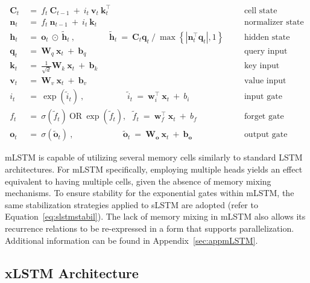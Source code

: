 \begin{align}
\label{eq:mlstm_recurrent_begin}
\mathbf{C}_t \ &= \  f_t \ \mathbf{C}_{t-1} \ + \ 
  i_t \ \mathbf{v}_t \ \mathbf{k}_t^\top & &  &\text{cell state} \\
\mathbf{n}_t \ &= \  f_t \ \mathbf{n}_{t-1} \ + \ 
  i_t \ \mathbf{k}_t & &  &\text{normalizer state} \\
\mathbf{h}_t  \ &= \ \mathbf{o}_t \ \odot \ \tilde{\mathbf{h}}_t
\ , \qquad \qquad 
\tilde{\mathbf{h}}_t \ = \   \mathbf{C}_t \mathbf{q}_t \ / \ 
  \max \left\{ |\mathbf{n}_t^\top \mathbf{q}_t|, 1 \right\} 
   &&&\text{hidden state} \\
\mathbf{q}_t \ &= \ \mathbf{W}_q \ \mathbf{x}_t \ + \ \mathbf{b}_q  & &  &\text{query input} \\
\mathbf{k}_t \ &= \ \frac{1}{\sqrt{d}} \mathbf{W}_k \ \mathbf{x}_t \ + \ \mathbf{b}_k  & &  &\text{key input} \\
\mathbf{v}_t \ &= \ \mathbf{W}_v \ \mathbf{x}_t \ + \ \mathbf{b}_v  & &  &\text{value input} \\
i_t \ &= \ \!\exp \!  \! \left( \tilde{i}_t  \right) \ , 
 \qquad \qquad \ \ \ \ \,
  \tilde{i}_t \ = \ \mathbf{w}^\top_{i} \ \mathbf{x}_t \ + \  b_{i} \ \ \ 
  &&&\text{input gate} \\
f_t \ &= \ \sigma \!  \left(  \tilde{f}_t \right) \ \text{OR} \ \!\exp \!  \! \left(  \tilde{f}_t \right) , \ \ \: \!
\tilde{f}_t \ = \ \mathbf{w}^\top_{f} \ \mathbf{x}_t  \ + \
  b_{f}
  &&& \text{forget gate} \\
\label{eq:mlstm_recurrent_end}
\mathbf{o}_t \ &= \ \sigma \left( \tilde{\mathbf{o}}_t \right) \ , \qquad \qquad \quad \ \ \ \,
  \tilde{\mathbf{o}}_t  \ = \ \mathbf{W}_{\mathbf{o}} \ \mathbf{x}_t \ + \
  \mathbf{b}_{\mathbf{o}}
  &&&\text{output gate} 
\end{align}

mLSTM is capable of utilizing several memory cells similarly to standard LSTM architectures. For mLSTM specifically, employing multiple heads yields an effect equivalent to having multiple cells, given the absence of memory mixing mechanisms. To ensure stability for the exponential gates within mLSTM, the same stabilization strategies applied to sLSTM are adopted (refer to Equation~\ref{eq:slstmstabil}). The lack of memory mixing in mLSTM also allows its recurrence relations to be re-expressed in a form that supports parallelization. Additional information can be found in Appendix~\ref{sec:appmLSTM}.

\subsection{xLSTM Architecture}
\label{sec:xLSTMarch}

